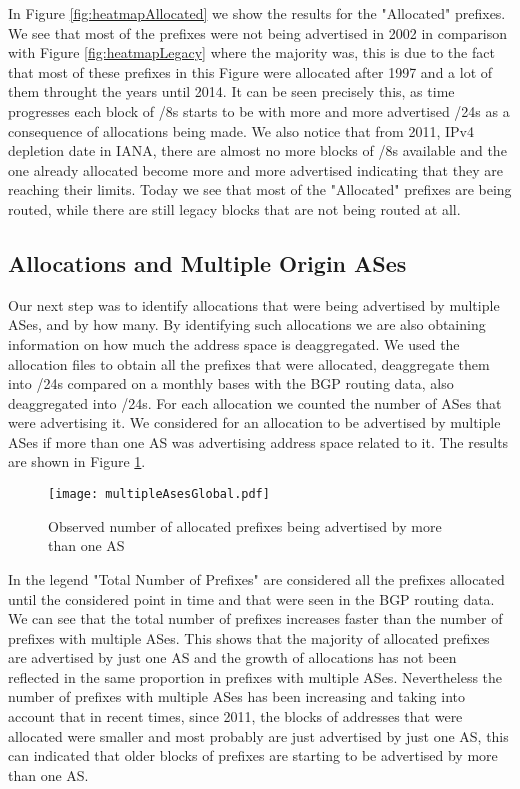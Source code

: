\documentclass[11pt,a4paper]{scrreprt}
\begin{document}
In Figure \ref{fig:heatmapAllocated} we show the results for the "Allocated" prefixes. We see that most of the prefixes were not being advertised in 2002 in comparison with Figure \ref{fig:heatmapLegacy} where the majority was, this is due to the fact that most of these prefixes in this Figure were allocated after 1997 and a lot of them throught the years until 2014. It can be seen precisely this, as time progresses each block of /8s starts to be with more and more advertised /24s as a consequence of allocations being made. We also notice that from 2011, IPv4 depletion date in IANA, there are almost no more blocks of /8s available and the one already allocated become more and more advertised indicating that they are reaching their limits. Today we see that most of the "Allocated" prefixes are being routed, while there are still legacy blocks that are not being routed at all. 


\subsection{Allocations and Multiple Origin ASes}

Our next step was to identify allocations that were being advertised by multiple ASes, and by how many. By identifying such allocations we are also obtaining information on how much the address space is deaggregated. 
We used the allocation files to obtain all the prefixes that were allocated, deaggregate them into /24s compared on a monthly bases with the BGP routing data, also deaggregated into /24s. For each allocation we counted the number of ASes that were advertising it. We considered for an allocation to be advertised by multiple ASes if more than one AS was advertising address space related to it. The results are shown in Figure \ref{fig:multipleAsesGlobal}.

\begin{figure}[!h]
\centering
\texttt{[image: multipleAsesGlobal.pdf]}
\caption{Observed number of allocated prefixes being advertised by more than one AS}
\label{fig:multipleAsesGlobal}
\end{figure}

In the legend "Total Number of Prefixes" are considered all the prefixes allocated until the considered point in time and that were seen in the BGP routing data.
We can see that the total number of prefixes increases faster than the number of prefixes with multiple ASes. This shows that the majority of allocated prefixes are advertised by just one AS and the growth of allocations has not been reflected in the same proportion in prefixes with multiple ASes. Nevertheless the number of prefixes with multiple ASes has been increasing and taking into account that in recent times, since 2011, the blocks of addresses that were allocated were smaller and most probably are just advertised by just one AS, this can indicated that older blocks of prefixes are starting to be advertised by more than one AS. 
\end{document}
